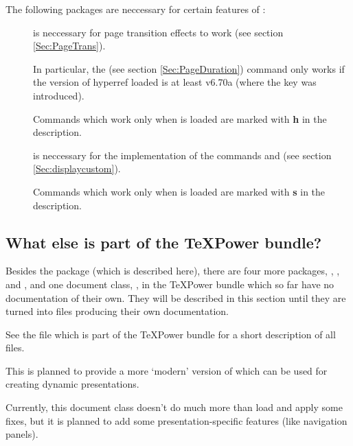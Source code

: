 \documentclass[12pt]{scrartcl}
\let\newslide=\relax
\begin{document}
The following packages are neccessary for certain features of :
\begin{description}
\item[]
  is neccessary for page transition effects to work (see section
  \ref{Sec:PageTrans}).

  In particular, the  (see section \ref{Sec:PageDuration}) command only works if the version of
  hyperref loaded is at least v6.70a (where the  key was introduced).

  Commands which work only when  is loaded are marked with \textbf{\textsf{h}} in the description.

\newslide

\item[]
  is neccessary for the implementation of the commands  and
   (see section \ref{Sec:displaycustom}).

  Commands which work only when  is loaded are marked with \textbf{\textsf{s}} in the description.
\end{description}

\newslide

\subsection{What else is part of the \TeX Power bundle?}
Besides the package  (which is described here), there are four
more packages, , ,  and
, and one document class,
, in the \TeX Power bundle which so far have no documentation
of their own. They will be described in this section until they are turned
into  files producing their own documentation.

See the file  which is part of the \TeX Power bundle for a short description of all files.

\newslide

This is planned to provide a more `modern' version of  which can be used for creating dynamic
presentations.

Currently, this document class doesn't do much more than load  and apply some fixes, but it is planned to
add some presentation-specific features (like navigation panels).
\end{document}
